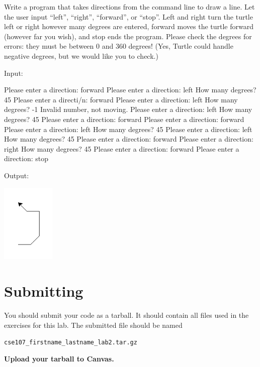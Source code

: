 \documentclass[11pt]{cselabheader}
\begin{document}
\begin{ex}[navigate.py] Write a program that takes directions from the command line
    to draw a line. Let the user input ``left'', ``right'', ``forward'', or
    ``stop''. Left and right turn the turtle left or right however many degrees
    are entered, forward moves the turtle forward (however far you wish), and
    stop ends the program. Please check the degrees for errors: they must be
    between 0 and 360 degrees! (Yes, Turtle could handle negative degrees, but
    we would like you to check.)

    Input:

  \begin{verbatimcode}
Please enter a direction: forward
Please enter a direction: left
How many degrees? 45
Please enter a directi/n: forward
Please enter a direction: left
How many degrees? -1
Invalid number, not moving.
Please enter a direction: left
How many degrees? 45
Please enter a direction: forward
Please enter a direction: forward
Please enter a direction: left
How many degrees? 45
Please enter a direction: left
How many degrees? 45
Please enter a direction: forward
Please enter a direction: right
How many degrees? 45
Please enter a direction: forward
Please enter a direction: stop
  \end{verbatimcode}

    Output:
    \begin{center}
    \includegraphics[width=1.0in]{img/navigate}
  \end{center}

\end{ex}

\pagebreak

\section{Submitting}

You should submit your code as a tarball. It should contain all files
used in the exercises for this lab. The submitted file should be named
\begin{center}
  \texttt{cse107\_firstname\_lastname\_lab2.tar.gz}
\end{center}

\begin{center}
  \textbf{Upload your tarball to Canvas.}
\end{center}

\listoftheorems
\end{document}
